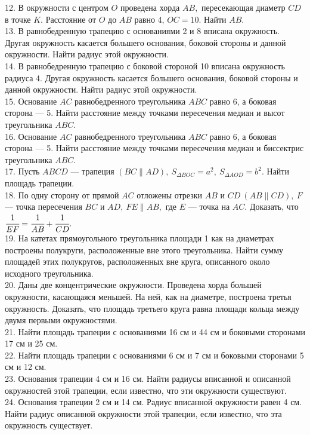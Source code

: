 \documentclass[12pt]{article}
\begin{document}
12. В окружности с центром $O$ проведена хорда $AB,$ пересекающая диаметр $CD$ в точке $K.$ Расстояние от  $O$ до $AB$ равно 4, $OC=10.$ Найти $AB.$\\
13. В равнобедренную трапецию с основаниями 2 и 8 вписана окружность. Другая окружность касается большего основания, боковой стороны и данной окружности. Найти радиус этой окружности.\\
14. В равнобедренную трапецию с боковой стороной 10 вписана окружность радиуса 4. Другая окружность касается большего основания, боковой стороны и данной окружности. Найти радиус этой окружности.\\
15. Основание $AC$ равнобедренного треугольника $ABC$ равно 6, а боковая сторона --- 5. Найти расстояние между точками пересечения медиан и высот треугольника $ABC.$\\
16. Основание $AC$ равнобедренного треугольника $ABC$ равно 6, а боковая сторона --- 5. Найти расстояние между точками пересечения медиан и биссектрис треугольника $ABC.$\\
17. Пусть $ABCD$ --- трапеция $(BC\parallel AD),\ S_{\Delta BOC}=a^2,\ S_{\Delta AOD}=b^2.$ Найти площадь трапеции.\\
18. По одну сторону от прямой $AC$ отложены отрезки $AB$ и $CD\ (AB\parallel CD),\ F$ --- точка пересечения $BC$ и $AD,\ FE\parallel AB,$ где $E$ --- точка на $AC.$ Доказать, что $\cfrac{1}{EF}=\cfrac{1}{AB}+\cfrac{1}{CD}.$\\
19. На катетах прямоугольного треугольника площади 1 как на диаметрах построены полукруги, расположенные вне этого треугольника. Найти сумму площадей этих полукругов, расположенных вне круга, описанного около исходного треугольника.\\
20. Даны две концентрические окружности. Проведена хорда большей окружности, касающаяся меньшей. На ней, как на диаметре, построена третья окружность. Доказать, что площадь третьего круга равна площади кольца между двумя первыми окружностями.\\
21. Найти площадь трапеции с основаниями 16 см и 44 см и боковыми сторонами 17 см и 25 см.\\
22. Найти площадь трапеции с основаниями 6 см и 7 см и боковыми сторонами 5 см и 12 см.\\
23. Основания трапеции 4 см и 16 см. Найти радиусы вписанной и описанной окружностей этой трапеции, если известно, что эти окружности существуют.\\
24. Основания трапеции 2 см и 14 см. Радиус вписанной окружности равен 4 см. Найти радиус описанной окружности этой трапеции, если известно, что эта окружность существует.\\
\end{document}

